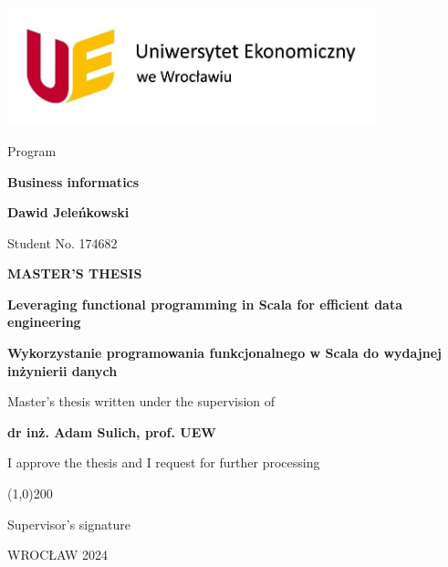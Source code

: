 \begin{titlepage}
\begin{center}

\vspace{0cm}
\includegraphics[width=0.8\textwidth]{images/uewroc.jpg}

\vspace{0cm}
Program

\textbf{Business informatics}

\vspace{0cm}
{\Large \textbf{Dawid Jeleńkowski}}

Student No. 174682

\vspace{1cm}
\textbf{MASTER’S THESIS}

\vspace{1cm}
{\huge \textbf{Leveraging functional programming in Scala for efficient data engineering}}

\textbf{Wykorzystanie programowania funkcjonalnego w Scala do wydajnej inżynierii danych}

\vspace{2cm}
Master’s thesis written under the supervision of

{\Large \textbf{dr inż. Adam Sulich, prof. UEW}}

\vspace{1cm}
I approve the thesis and I request for further processing

\vspace{0cm}
\line(1,0){200}

Supervisor’s signature

\vspace{0cm}
WROCŁAW 2024
\end{center}
\end{titlepage}